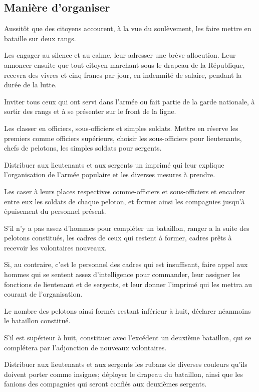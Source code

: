 \documentclass[french,twoside]{book} %
\begin{document}
\subsection[Manière d’organiser]{Manière d’organiser}
\noindent Aussitôt que des citoyens accourent, à la vue du soulèvement, les faire mettre en bataille sur deux rangs.\par
Les engager au silence et au calme, leur adresser une brève allocution. Leur annoncer ensuite que tout citoyen marchant sous le drapeau de la République, recevra des vivres et cinq francs par jour, en indemnité de salaire, pendant la durée de la lutte.\par
Inviter tous ceux qui ont servi dans l’armée ou fait partie de la garde nationale, à sortir des rangs et à se présenter sur le front de la ligne.\par
Les classer en officiers, sous-officiers et simples soldats. Mettre en réserve les premiers comme officiers supérieurs, choisir les sous-officiers pour lieutenants, chefs de pelotons, les simples soldats pour sergents.\par
Distribuer aux lieutenants et aux sergents un imprimé qui leur explique l’organisation de l’armée populaire et les diverses mesures à prendre.\par
Les caser à leurs places respectives comme-officiers et sous-officiers et encadrer entre eux les soldats de chaque peloton, et former ainsi les compagnies jusqu’à épuisement du personnel présent.\par
S'il n’y a pas assez d’hommes pour compléter un bataillon, ranger a la suite des pelotons constitués, les cadres de ceux qui restent à former, cadres prêts à recevoir les volontaires nouveaux.\par
Si, au contraire, c’est le personnel des cadres qui est insuffisant, faire appel aux hommes qui se sentent assez d’intelligence pour commander, leur assigner les fonctions de lieutenant et de sergents, et leur donner l’imprimé qui les mettra au courant de l’organisation.\par
Le nombre des pelotons ainsi formés restant inférieur à huit, déclarer néanmoins le bataillon constitué.\par
S'il est supérieur à huit, constituer avec l’excédent un deuxième bataillon, qui se complétera par l’adjonction de nouveaux volontaires.\par
Distribuer aux lieutenants et aux sergents les rubans de diverses couleurs qu’ils doivent porter comme insignes; déployer le drapeau du bataillon, ainsi que les fanions des compagnies qui seront confiés aux deuxièmes sergents.\par
\end{document}
